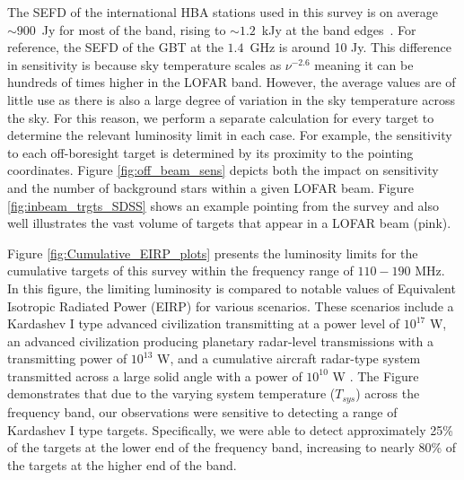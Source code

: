 The SEFD of the international HBA stations used in this survey is on average $\sim 900$~Jy for most of the band, rising to $\sim 1.2$~kJy at the band edges~\citep{van_haarlem_lofar_2013}. For reference, the SEFD of the GBT at the $1.4$~GHz is around 10 Jy. This difference in sensitivity is 
because sky temperature scales as $\nu^{-2.6}$ meaning it can be hundreds of times higher in the LOFAR band. However, the average values are of little use as there is also a large degree of variation in the sky temperature across the sky. For this reason, we perform a separate calculation for every target to determine the relevant luminosity limit in each case.  For example, the sensitivity to each off-boresight target is determined by its proximity to the pointing coordinates. Figure \ref{fig:off_beam_sens} depicts both the impact on sensitivity and the number of background stars within a given LOFAR beam. Figure \ref{fig:inbeam_trgts_SDSS} shows an example pointing from the survey and also well illustrates the vast volume of targets that appear in a LOFAR beam (pink).


Figure \ref{fig:Cumulative_EIRP_plots} presents the luminosity limits for the cumulative targets of this survey within the frequency range of $110-190$ MHz. In this figure, the limiting luminosity is compared to notable values of Equivalent Isotropic Radiated Power (EIRP) for various scenarios. These scenarios include a Kardashev I type advanced civilization transmitting at a power level of $10^{17}$ W, an advanced civilization producing planetary radar-level transmissions with a transmitting power of $10^{13}$ W, and a cumulative aircraft radar-type system transmitted across a large solid angle with a power of $10^{10}$ W \citep{Siemion_KEPLER_ApJ}. The Figure demonstrates that due to the varying system temperature ($T_{sys}$) across the frequency band, our observations were sensitive to detecting a range of Kardashev I type targets. Specifically, we were able to detect approximately 25\% of the targets at the lower end of the frequency band, increasing to nearly 80\% of the targets at the higher end of the band.

